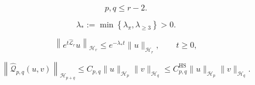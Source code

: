 \documentclass[10pt,a4paper]{amsart}
\begin{document}
\begin{equation}
p,q\leq r-2.
\label{eq:maxwell_jet_strict_triangularity}
\end{equation}

\begin{equation}
\lambda_*
:=
\min
\left\{
\lambda_\pi,
\lambda_{\ge 3}
\right\}
>0.
\label{eq:maxwell_jet_uniform_gap}
\end{equation}

\begin{equation}
\left\|
e^{t\widehat{\mathcal L}_r}u
\right\|_{\mathscr H_r}
\leq
e^{-\lambda_*t}
\|u\|_{\mathscr H_r},
\qquad
t\geq0,
\label{eq:maxwell_jet_semigroup_bound}
\end{equation}

\begin{equation}
\left\|
\widehat{\mathcal Q}_{p,q}(u,v)
\right\|_{\mathscr H_{p+q}}
\leq
C_{p,q}
\|u\|_{\mathscr H_p}
\|v\|_{\mathscr H_q}
\leq
C_{p,q}^{\mathrm{HS}}
\|u\|_{\mathscr H_p}
\|v\|_{\mathscr H_q}.
\label{eq:maxwell_jet_bilinear_bound}
\end{equation}
\end{document}
